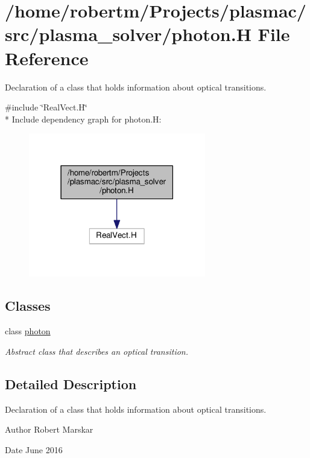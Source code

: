 \hypertarget{photon_8H}{}\section{/home/robertm/\+Projects/plasmac/src/plasma\+\_\+solver/photon.H File Reference}
\label{photon_8H}


Declaration of a class that holds information about optical transitions.  


{\ttfamily \#include \char`\"{}Real\+Vect.\+H\char`\"{}}\\*
Include dependency graph for photon.\+H\+:\nopagebreak
\begin{figure}[H]
\begin{center}
\leavevmode
\includegraphics[width=219pt]{photon_8H__incl}
\end{center}
\end{figure}
\subsection*{Classes}
\begin{DoxyCompactItemize}
\item 
class \hyperlink{classphoton}{photon}
\begin{DoxyCompactList}\small\item\em Abstract class that describes an optical transition. \end{DoxyCompactList}\end{DoxyCompactItemize}


\subsection{Detailed Description}
Declaration of a class that holds information about optical transitions. 

\begin{DoxyAuthor}{Author}
Robert Marskar 
\end{DoxyAuthor}
\begin{DoxyDate}{Date}
June 2016 
\end{DoxyDate}
